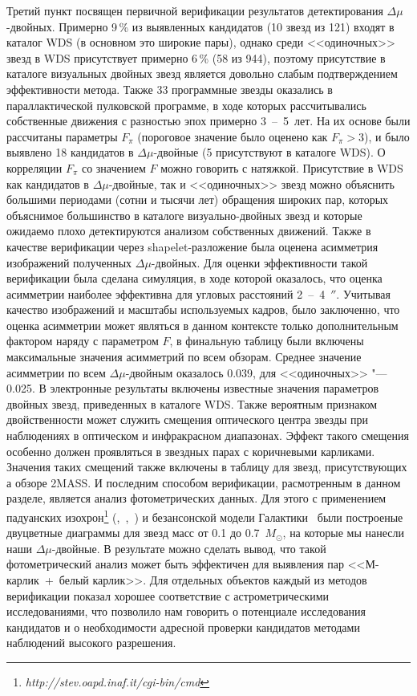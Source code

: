 Третий пункт посвящен первичной верификации результатов детектирования $\Delta\mu$-двойных. Примерно 9\,\% из выявленных кандидатов (10 звезд из 121) входят в каталог WDS (в основном это широкие пары), однако среди <<одиночных>> звезд в WDS присутствует примерно 6\,\% (58 из 944), поэтому присутствие в каталоге визуальных двойных звезд является довольно слабым подтверждением эффективности метода. Также 33 программные звезды оказались в параллактической пулковской программе, в ходе которых рассчитывались собственные движения с разностью эпох примерно 3~--~5~лет. На их основе были рассчитаны параметры $F_\pi$ (пороговое значение было оценено как $F_\pi>3$), и было выявлено 18 кандидатов в $\Delta\mu$-двойные (5 присутствуют в каталоге WDS). О корреляции $F_\pi$ со значением $F$ можно говорить с натяжкой. Присутствие в WDS как кандидатов в $\Delta\mu$-двойные, так и <<одиночных>> звезд можно объяснить большими периодами (сотни и тысячи лет) обращения широких пар, которых объяснимое большинство в каталоге визуально-двойных звезд и которые ожидаемо плохо детектируются анализом собственных движений. Также в качестве верификации через shapelet-разложение была оценена асимметрия изображений полученных $\Delta\mu$-двойных. Для оценки эффективности такой верификации была сделана симуляция, в ходе которой оказалось, что оценка асимметрии наиболее эффективна для угловых расстояний 2~--~4~$''$. Учитывая качество изображений и масштабы используемых кадров, было заключенно, что оценка асимметрии может являться в данном контексте только дополнительным фактором наряду с параметром $F$, в финальную таблицу были включены максимальные значения асимметрий по всем обзорам. Среднее значение асимметрии по всем $\Delta\mu$-двойным оказалось 0.039, для <<одиночных>> "--- 0.025. В электронные результаты включены известные значения параметров двойных звезд, приведенных в каталоге WDS. Также вероятным признаком двойственности может служить смещения оптического центра звезды при наблюдениях в оптическом и инфракрасном диапазонах. Эффект такого смещения особенно должен проявляться в звездных парах с коричневыми карликами. Значения таких смещений также включены в таблицу для звезд, присутствующих а обзоре 2MASS. И последним способом верификации, расмотренным в данном разделе, является анализ фотометрических данных. Для этого с применением падуанских изохрон\footnote{\textit{http://stev.oapd.inaf.it/cgi-bin/cmd}} (\cite{2012MNRAS.427..127B},~\cite{2014MNRAS.444.2525C},~\cite{2014MNRAS.445.4287T}) и безансонской модели Галактики~\cite{2003A&A...409..523R} были построеные двуцветные диаграммы для звезд масс от 0.1 до 0.7~$M_{\odot}$, на которые мы нанесли наши $\Delta\mu$-двойные. В результате можно сделать вывод, что такой фотометрический анализ может быть эффектичен для выявления пар <<М-карлик~+~белый карлик>>. Для отдельных объектов каждый из методов верификации показал хорошее соответствие с астрометрическими исследованиями, что позволило нам говорить о потенциале исследования кандидатов и о необходимости адресной проверки кандидатов методами наблюдений высокого разрешения.

